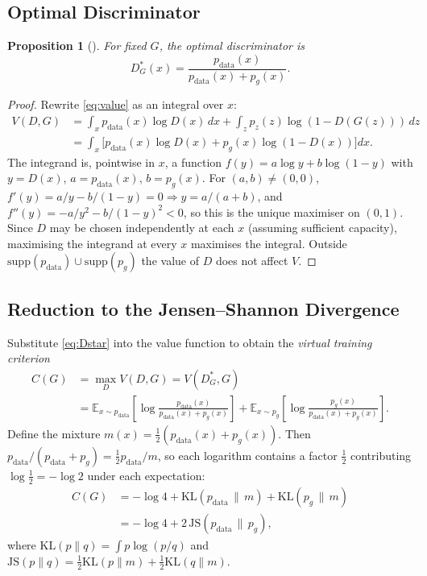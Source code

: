 \documentclass[conference]{IEEEtran}
\newcommand{\E}{\mathbb{E}}
\newcommand{\pdata}{p_{\mathrm{data}}}
\newcommand{\pg}{p_{g}}
\newcommand{\pz}{p_{z}}
\newcommand{\JS}{\mathrm{JS}}
\newcommand{\KL}{\mathrm{KL}}
\theoremstyle{plain}
\newtheorem{proposition}{Proposition}
\theoremstyle{definition}
\begin{document}
\subsection{Optimal Discriminator}
\begin{proposition}[\cite{goodfellow2014gan}]\label{prop:Dstar}
For fixed $G$, the optimal discriminator is
\begin{equation}
D^*_G(x)=\frac{\pdata(x)}{\pdata(x)+\pg(x)}.
\label{eq:Dstar}
\end{equation}
\end{proposition}
\begin{proof}
Rewrite \eqref{eq:value} as an integral over $x$:
\begin{align}
V(D,G)&=\int_{x}\pdata(x)\log D(x)\,dx+\int_{z}\pz(z)\log(1-D(G(z)))\,dz \nonumber\\
&=\int_{x}\big[\pdata(x)\log D(x)+\pg(x)\log(1-D(x))\big]dx.
\end{align}
The integrand is, pointwise in $x$, a function $f(y)=a\log y+b\log(1-y)$ with $y=D(x)$, $a=\pdata(x)$, $b=\pg(x)$. For $(a,b)\neq(0,0)$, $f'(y)=a/y-b/(1-y)=0\Rightarrow y=a/(a+b)$, and $f''(y)=-a/y^2-b/(1-y)^2<0$, so this is the unique maximiser on $(0,1)$. Since $D$ may be chosen independently at each $x$ (assuming sufficient capacity), maximising the integrand at every $x$ maximises the integral. Outside $\mathrm{supp}(\pdata)\cup\mathrm{supp}(\pg)$ the value of $D$ does not affect $V$.
\end{proof}

\subsection{Reduction to the Jensen--Shannon Divergence}
Substitute \eqref{eq:Dstar} into the value function to obtain the \emph{virtual training criterion}
\begin{align}
C(G)&=\max_D V(D,G)=V(D^*_G,G)\nonumber\\
&=\E_{x\sim\pdata}\!\left[\log\frac{\pdata(x)}{\pdata(x)+\pg(x)}\right]\!+\!\E_{x\sim\pg}\!\left[\log\frac{\pg(x)}{\pdata(x)+\pg(x)}\right].
\label{eq:CG1}
\end{align}
Define the mixture $m(x)=\tfrac12(\pdata(x)+\pg(x))$. Then $\pdata/(\pdata+\pg)=\tfrac12\pdata/m$, so each logarithm contains a factor $\tfrac12$ contributing $\log\tfrac12=-\log2$ under each expectation:
\begin{align}
C(G)&=-\log 4+\KL(\pdata\,\|\,m)+\KL(\pg\,\|\,m)\nonumber\\
&=-\log4+2\,\JS(\pdata\,\|\,\pg),
\label{eq:CG2}
\end{align}
where $\KL(p\|q)=\int p\log(p/q)$ and $\JS(p\|q)=\tfrac12\KL(p\|m)+\tfrac12\KL(q\|m)$.
\end{document}
